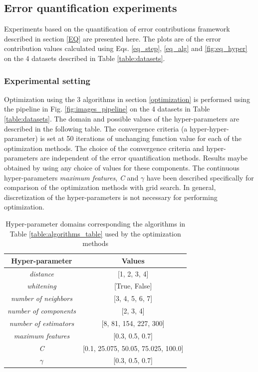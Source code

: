 \subsection{Error quantification experiments}
\label{eq_expts}
Experiments based on the quantification of error contributions framework described in section \ref{EQ} are presented here. The plots are of the error contribution values calculated using Eqs. \ref{eq_step}, \ref{eq_alg} and \ref{fig:eq_hyper} on the 4 datasets described in Table \ref{table:datasets}. 
\subsubsection{Experimental setting}
Optimization using the 3 algorithms in section \ref{optimization} is performed using the pipeline in Fig. \ref{fig:images_pipeline} on the 4 datasets in Table \ref{table:datasets}. The domain and possible values of the hyper-parameters are described in the following table. 
The convergence criteria (a hyper-hyper-parameter) is set at 50 iterations of unchanging  function value for each of the optimization methods. The choice of the convergence criteria and hyper-parameters are independent of the error quantification methods. Results maybe obtained by using any choice of values for these components. The continuous hyper-parameters \textit{maximum features}, \textit{C} and $\gamma$ have been described specifically for comparison of the optimization methods with grid search. In general, discretization of the hyper-parameters is not necessary for performing optimization.
\begin{table}[ht!]
\centering
\caption{Hyper-parameter domains corresponding the algorithms in Table \ref{table:algorithms_table} used by the optimization methods}
\begin{tabular}{ |c|c| } 
 \hline
 Hyper-parameter & Values \\ 
 \hline
 \textit{distance} & [1, 2, 3, 4]\\
 \hline
 \textit{whitening} & [True, False]\\
 \hline
  \textit{number of neighbors} & [3, 4, 5, 6, 7] \\
 \hline
 \textit{number of components} & [2, 3, 4]\\
 \hline
 \textit{number of estimators} & [8,  81, 154, 227, 300]\\
 \hline
 \textit{maximum features} & [0.3, 0.5, 0.7]\\
 \hline
 \textit{C} & [0.1, 25.075, 50.05, 75.025, 100.0] \\
 \hline
 $\gamma$ & [0.3, 0.5, 0.7] \\
 \hline
 \end{tabular}
\label{table:hyper}
\end{table}
